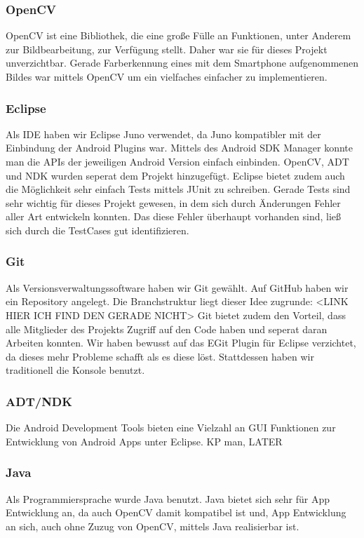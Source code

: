 \subsubsection{OpenCV}  %
OpenCV ist eine Bibliothek, die eine große Fülle an Funktionen, unter Anderem zur Bildbearbeitung, zur Verfügung stellt.
Daher war sie für dieses Projekt unverzichtbar. Gerade Farberkennung eines mit dem Smartphone aufgenommenen Bildes
war mittels OpenCV um ein vielfaches einfacher zu implementieren.
\subsubsection{Eclipse}  %
Als IDE haben wir Eclipse Juno verwendet, da Juno kompatibler mit der Einbindung der Android Plugins war.
Mittels des Android SDK Manager konnte man die APIs der jeweiligen Android Version einfach einbinden.
OpenCV, ADT und NDK wurden seperat dem Projekt hinzugefügt.
Eclipse bietet zudem auch die Möglichkeit sehr einfach Tests mittels JUnit zu schreiben.
Gerade Tests sind sehr wichtig für dieses Projekt gewesen, in dem sich durch Änderungen Fehler aller Art
entwickeln konnten. Das diese Fehler überhaupt vorhanden sind, ließ sich durch die TestCases gut identifizieren.
\subsubsection{Git}  %
Als Versionsverwaltungssoftware haben wir Git gewählt. Auf GitHub haben wir ein Repository angelegt.
Die Branchstruktur liegt dieser Idee zugrunde: <LINK HIER ICH FIND DEN GERADE NICHT>
Git bietet zudem den Vorteil, dass alle Mitglieder des Projekts Zugriff auf den Code haben und
seperat daran Arbeiten konnten.
Wir haben bewusst auf das EGit Plugin für Eclipse verzichtet, da dieses mehr Probleme schafft als es diese löst.
Stattdessen haben wir traditionell die Konsole benutzt.
\subsubsection{ADT/NDK}  %
Die Android Development Tools bieten eine Vielzahl an GUI Funktionen zur Entwicklung von Android Apps unter Eclipse.
KP man, LATER
\subsubsection{Java}  %
Als Programmiersprache wurde Java benutzt. Java bietet sich sehr für App Entwicklung an, da auch OpenCV
damit kompatibel ist und, App Entwicklung an sich, auch ohne Zuzug von OpenCV, mittels Java realisierbar
ist.


